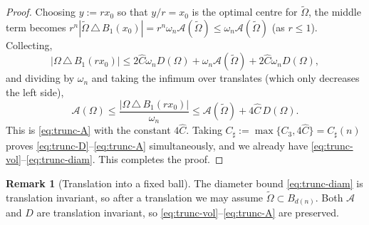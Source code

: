 \documentclass[11pt]{amsart}
\theoremstyle{definition}
\newtheorem{remark}[theorem]{Remark}
\newcommand{\Om}{\Omega}
\newcommand{\Fr}{\mathcal A}
\newcommand{\abs}[1]{\left|#1\right|}
\newcommand{\Otilde}{\widetilde{\Omega}}
\begin{document}
\begin{proof}
Choosing $y:=r x_0$ so that $y/r=x_0$ is the
optimal centre for $\Otilde$, the middle term becomes
$r^n\abs{\Otilde\,\triangle\,B_1(x_0)}=r^n\omega_n\Fr(\Otilde)
\le\omega_n\Fr(\Otilde)$ (as $r\le1$). Collecting,
\[
   \abs{\Om\,\triangle\,B_1(rx_0)}
   \le2\widehat C\omega_n D(\Om)+\omega_n\Fr(\Otilde)+2\widehat C\omega_n D(\Om),
\]
and dividing by $\omega_n$ and taking the infimum over translates (which
only decreases the left side),
\begin{equation}\label{eq:trunc-A-pre}
   \Fr(\Om)\le\frac{\abs{\Om\,\triangle\,B_1(rx_0)}}{\omega_n}
   \le\Fr(\Otilde)+4\widehat C\,D(\Om).
\end{equation}
This is \eqref{eq:trunc-A} with the constant $4\widehat C$.
Taking $C_\sharp:=\max\{C_3,4\widehat C\}=C_\sharp(n)$ proves
\eqref{eq:trunc-D}--\eqref{eq:trunc-A} simultaneously, and we already have
\eqref{eq:trunc-vol}--\eqref{eq:trunc-diam}. This completes the proof.
\end{proof}

\begin{remark}[Translation into a fixed ball]\label{rem:translate}
The diameter bound \eqref{eq:trunc-diam} is translation invariant, so
after a translation we may assume $\Otilde\subset B_{d(n)}$. Both
$\Fr$ and $D$ are translation invariant, so
\eqref{eq:trunc-vol}--\eqref{eq:trunc-A} are preserved.
\end{remark}
\end{document}
